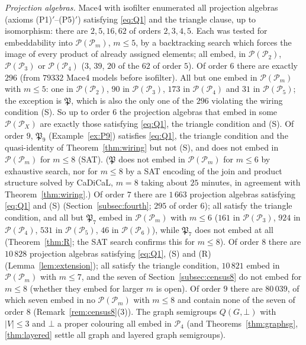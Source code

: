 \documentclass[11pt]{amsart}
\theoremstyle{definition}
\renewcommand{\P}{\mathcal{P}}
\begin{document}
\emph{Projection algebras.} Mace4 with isofilter enumerated all projection algebras (axioms (P1)$'$--(P5)$'$) satisfying \eqref{eq:Q1} and the triangle clause, up to isomorphism: there are $2,5,16,62$ of orders $2,3,4,5$. Each was tested for embeddability into $\P(\P_m)$, $m\le5$, by a backtracking search which forces the image of every product of already assigned elements; all embed, in $\P(\P_2)$, $\P(\P_3)$ or $\P(\P_4)$ ($3$, $39$, $20$ of the $62$ of order $5$). Of order $6$ there are exactly $296$ (from $79332$ Mace4 models before isofilter). All but one embed in $\P(\P_m)$ with $m\le5$: one in $\P(\P_2)$, $90$ in $\P(\P_3)$, $173$ in $\P(\P_4)$ and $31$ in $\P(\P_5)$; the exception is $\mathfrak P$, which is also the only one of the $296$ violating the wiring condition (S). So up to order $6$ the projection algebras that embed in some $\P(\P_X)$ are exactly those satisfying \eqref{eq:Q1}, the triangle condition and (S). Of order $9$, $\mathfrak P_9$ (Example~\ref{ex:P9}) satisfies \eqref{eq:Q1}, the triangle condition and the quasi-identity of Theorem~\ref{thm:wiring} but not (S), and does not embed in $\P(\P_m)$ for $m\le8$ (SAT). ($\mathfrak P$ does not embed in $\P(\P_m)$ for $m\le6$ by exhaustive search, nor for $m\le8$ by a SAT encoding of the join and product structure solved by CaDiCaL, $m=8$ taking about $25$ minutes, in agreement with Theorem~\ref{thm:wiring}.) Of order $7$ there are $1\,663$ projection algebras satisfying \eqref{eq:Q1} and (S) (Section~\ref{subsec:fourth}; $295$ of order $6$); all satisfy the triangle condition, and all but $\mathfrak P_7$ embed in $\P(\P_m)$ with $m\le6$ ($161$ in $\P(\P_3)$, $924$ in $\P(\P_4)$, $531$ in $\P(\P_5)$, $46$ in $\P(\P_6)$), while $\mathfrak P_7$ does not embed at all (Theorem~\ref{thm:R}; the SAT search confirms this for $m\le8$). Of order $8$ there are $10\,828$ projection algebras satisfying \eqref{eq:Q1}, (S) and (R) (Lemma~\ref{lem:extension}); all satisfy the triangle condition, $10\,821$ embed in $\P(\P_m)$ with $m\le7$, and the seven of Section~\ref{subsec:census8} do not embed for $m\le8$ (whether they embed for larger $m$ is open). Of order $9$ there are $80\,039$, of which seven embed in no $\P(\P_m)$ with $m\le8$ and contain none of the seven of order $8$ (Remark~\ref{rem:census8}(3)). The graph semigroups $Q(G,\bot)$ with $|V|\le3$ and $\bot$ a proper colouring all embed in $\P_4$ (and Theorems~\ref{thm:graphsg}, \ref{thm:layered} settle all graph and layered graph semigroups).
\end{document}
